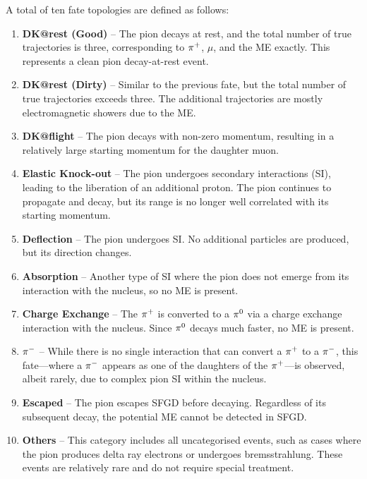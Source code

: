          A total of ten fate topologies are defined as follows:
          \begin{enumerate}
          \item \textbf{DK@rest (Good)} – The pion decays at rest, and the total number of true trajectories is three, corresponding to $\pi^+$, $\mu$, and the ME exactly. 
          This represents a clean pion decay-at-rest event.
          \item \textbf{DK@rest (Dirty)} – Similar to the previous fate, but the total number of true trajectories exceeds three. 
          The additional trajectories are mostly electromagnetic showers due to the ME.
          \item \textbf{DK@flight} – The pion decays with non-zero momentum, resulting in a relatively large starting momentum for the daughter muon.
          \item \textbf{Elastic Knock-out} – The pion undergoes secondary interactions (SI), leading to the liberation of an additional proton. 
          The pion continues to propagate and decay, but its range is no longer well correlated with its starting momentum.
          \item \textbf{Deflection} – The pion undergoes SI. 
          No additional particles are produced, but its direction changes.
          \item \textbf{Absorption} – Another type of SI where the pion does not emerge from its interaction with the nucleus, so no ME is present.
          \item \textbf{Charge Exchange} – The $\pi^+$ is converted to a $\pi^0$ via a charge exchange interaction with the nucleus. 
          Since $\pi^0$ decays much faster, no ME is present.
          \item \textbf{$\pi^-$} – While there is no single interaction that can convert a $\pi^+$ to a $\pi^-$, this fate—where a $\pi^-$ appears as one of the daughters of the $\pi^+$—is observed, albeit rarely, due to complex pion SI within the nucleus.
          \item \textbf{Escaped} – The pion escapes SFGD before decaying. 
          Regardless of its subsequent decay, the potential ME cannot be detected in SFGD.
          \item \textbf{Others} – This category includes all uncategorised events, such as cases where the pion produces delta ray electrons or undergoes bremsstrahlung. 
          These events are relatively rare and do not require special treatment.
          \end{enumerate}

